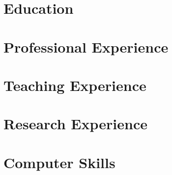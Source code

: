 \documentclass[letterpaper,11pt]{article}
\begin{document}
    

%     

\section{Education}
    

\section{Professional Experience}
    

\section{Teaching Experience}
    
    

\section{Research Experience}
    

\section{Computer Skills}
    

%     

%     
\end{document}
